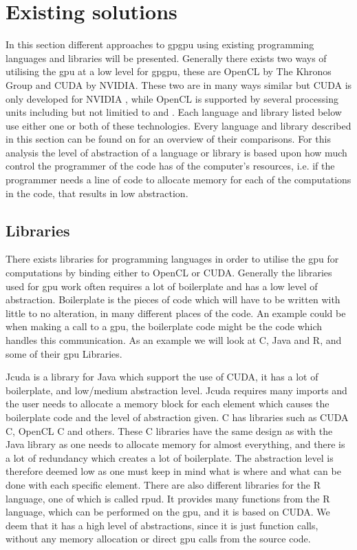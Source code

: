 \section{Existing solutions} %
\label{sec:state_of_the_art}
In this section different approaches to \acrshort{gpgpu} using existing programming languages and libraries will be presented.
Generally there exists two ways of utilising the \acrshort{gpu} at a low level for \acrshort{gpgpu}, these are OpenCL by The Khronos Group and CUDA by NVIDIA.
These two are in many ways similar but CUDA is only developed for NVIDIA , while OpenCL is supported by several processing units including but not limitied to  and .
Each language and library listed below use either one or both of these technologies.
Every language and library described in this section can be found on  for an overview of their comparisons.
For this analysis the level of abstraction of a language or library is based upon how much control the programmer of the code has of the computer's resources, i.e. if the programmer needs a line of code to allocate memory for each of the computations in the code, that results in low abstraction.
      
\subsection{Libraries} 
There exists libraries for programming languages in order to utilise the \acrshort{gpu} for computations by binding either to OpenCL or CUDA.
Generally the libraries used for \acrshort{gpu} work often requires a lot of boilerplate and has a low level of abstraction.
Boilerplate is the pieces of code which will have to be written with little to no alteration, in many different places of the code.
An example could be when making a call to a \acrshort{gpu}, the boilerplate code might be the code which handles this communication.
As an example we will look at C, Java and R, and some of their \acrshort{gpu} Libraries.

Jcuda is a library for Java which support the use of CUDA, it has a lot of boilerplate, and low/medium abstraction level. \citep{Java_library}
Jcuda requires many imports and the user needs to allocate a memory block for each element which causes the boilerplate code and the level of abstraction given. \citep{Java_malloc}
C has libraries such as CUDA C, OpenCL C and others.
These C libraries have the same design as with the Java library as one needs to allocate memory for almost everything, and there is a lot of redundancy which creates a lot of boilerplate. 
The abstraction level is therefore deemed low as one must keep in mind what is where and what can be done with each specific element. \citep{C_CUDA} 
There are also different libraries for the R language, one of which is called rpud.
It provides many functions from the R language, which can be performed on the \acrshort{gpu}, and it is based on CUDA.
We deem that it has a high level of abstractions, since it is just function calls, without any memory allocation or direct \acrshort{gpu} calls from the source code. \citep{Rcuda} 


